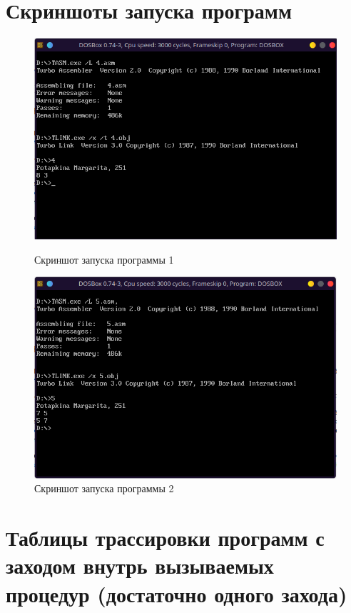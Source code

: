\documentclass[bachelor, och, otchet]{SCWorks}
\begin{document}
\section{Скриншоты запуска программ}
\begin{figure}[H]
\centering
\includegraphics[scale=0.9]{4.png}
\caption {Скриншот запуска программы 1}
\includegraphics[scale=0.9]{5.png}
\caption {Скриншот запуска программы 2}
\end{figure}

\section{Таблицы трассировки программ с заходом внутрь вызываемых процедур (достаточно одного захода)}
\tiny



\normalsize
\end{document}
